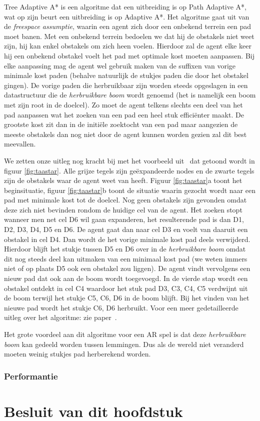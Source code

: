 Tree Adaptive A* is een algoritme dat een uitbreiding is op Path Adaptive A*, wat op zijn beurt een uitbreiding is op Adaptive A*. Het algoritme gaat uit van de \textit{freespace assumptie}, waarin een agent zich door een onbekend terrein een pad moet banen. Met een onbekend terrein bedoelen we dat hij de obstakels niet weet zijn, hij kan enkel obstakels om zich heen voelen. Hierdoor zal de agent elke keer hij een onbekend obstakel voelt het pad met optimale kost moeten aanpassen. Bij elke aanpassing mag de agent wel gebruik maken van de suffixen van vorige minimale kost paden (behalve natuurlijk de stukjes paden die door het obstakel gingen). De vorige paden die herbruikbaar zijn worden steeds opgeslagen in een datastructuur die de \textit{herbruikbare boom} wordt genoemd (het is namelijk een boom met zijn root in de doelcel). Zo moet de agent telkens slechts een deel van het pad aanpassen wat het zoeken van een pad een heel stuk effici\"enter maakt. De grootste kost zit dan in de initi\"ele zoektocht van een pad maar aangezien de meeste obstakels dan nog niet door de agent kunnen worden gezien zal dit best meevallen. 

We zetten onze uitleg nog kracht bij met het voorbeeld uit~\cite{hernandez2011tree} dat getoond wordt in figuur \ref{fig:taastar}. Alle grijze tegels zijn ge\"expandeerde nodes en de zwarte tegels zijn de obstakels waar de agent weet van heeft. Figuur \ref{fig:taastar}a toont het beginsituatie, figuur \ref{fig:taastar}b toont de situatie waarin gezocht wordt naar een pad met minimale kost tot de doelcel. Nog geen obstakels zijn gevonden omdat deze zich niet bevinden rondom de huidige cel van de agent. Het zoeken stopt wanneer men net cel D6 wil gaan expanderen, het resulterende pad is dan D1, D2, D3, D4, D5 en D6. De agent gaat dan naar cel D3 en voelt van daaruit een obstakel in cel D4. Dan wordt de het vorige minimale kost pad deels verwijderd. Hierdoor blijft het stukje tussen D5 en D6 over in de \textit{herbruikbare boom} omdat dit nog steeds deel kan uitmaken van een minimaal kost pad (we weten immers niet of op plaats D5 ook een obstakel zou liggen). De agent vindt vervolgens een nieuw pad dat ook aan de boom wordt toegevoegd. In de vierde stap wordt een obstakel ontdekt in cel C4 waardoor het stuk pad D3, C3, C4, C5 verdwijnt uit de boom terwijl het stukje C5, C6, D6 in de boom blijft. Bij het vinden van het nieuwe pad wordt het stukje C6, D6 herbruikt. Voor een meer gedetailleerde uitleg over het algoritme: zie paper~\cite{hernandez2011tree}.

Het grote voordeel aan dit algoritme voor een AR spel is dat deze \textit{herbruikbare boom} kan gedeeld worden tussen lemmingen. Dus als de wereld niet veranderd moeten weinig stukjes pad herberekend worden.


\subsubsection*{Performantie}

\section{Besluit van dit hoofdstuk}

